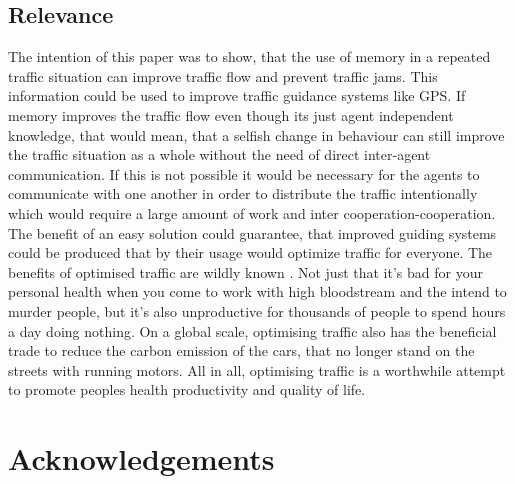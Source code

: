 \documentclass[a4paper,hidelinks]{article}
\begin{document}
\subsection{Relevance}
The intention of this paper was to show, that the use of memory in a repeated traffic situation can improve traffic flow and prevent traffic jams. This information could be used to improve traffic guidance systems like GPS. If memory improves the traffic flow even though its just agent independent knowledge, that would mean, that a selfish change in behaviour can still improve the traffic situation as a whole without the need of direct inter-agent communication. If this is not possible it would be necessary for the agents to communicate with one another in order to distribute the traffic intentionally which would require a large amount of work and inter cooperation-cooperation. The benefit of an easy solution could guarantee, that improved guiding systems could be produced that by their usage would optimize traffic for everyone. The benefits of optimised traffic are wildly known \cite{france2003multiagent}. Not just that it's bad for your personal health when you come to work with high bloodstream and the intend to murder people, but it's also unproductive for thousands of people to spend hours a day doing nothing. On a global scale, optimising traffic also has the beneficial trade to reduce the carbon emission of the cars, that no longer stand on the streets with running motors. All in all, optimising traffic is a worthwhile attempt to promote peoples health productivity and quality of life. 

\section{Acknowledgements}



\end{document}
